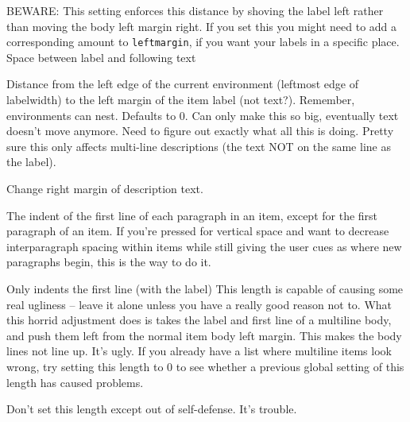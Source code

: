 \documentclass{article}
\begin{document}
\begin{description}[labelindent=2cm, leftmargin=\labelindent,
        ]
        BEWARE: This setting enforces this distance by shoving the
        label left rather than moving the body left margin right. If
        you set this you might need to add a corresponding amount to
        \texttt{leftmargin}, if you want your labels in a specific place.
        Space between label and following text
    \item [leftmargin] Distance from the left edge of the current
        environment (leftmost edge of labelwidth) to the left margin of the
        item label (not text?). Remember, environments can nest. Defaults to 0.
        Can only make this so big, eventually text doesn't move anymore.
        Need to figure out exactly what all this is doing.
        Pretty sure this only affects multi-line descriptions
        (the text NOT on the same line as the label).
    \item [rightmargin] Change right margin of description text.
    \item [listparindent] The indent of the first line of each
        paragraph in an item, except for the first paragraph of an
        item. If you're pressed for vertical space and want to
        decrease interparagraph spacing within items while still
        giving the user cues as where new paragraphs begin, this is
        the way to do it.
    \item [itemindent] Only indents the first line (with the label)
        This length is capable of causing some real ugliness -- leave
        it alone unless you have a really good reason not to. What
        this horrid adjustment does is takes the label and first line
        of a multiline body, and push them left from the normal item
        body left margin. This makes the body lines not line up. It's
        ugly. If you already have a list where multiline items look
        wrong, try setting this length to 0 to see whether a previous
        global setting of this length has caused problems.

        Don't set this length except out of self-defense. It's trouble.
\end{description}
\end{document}
